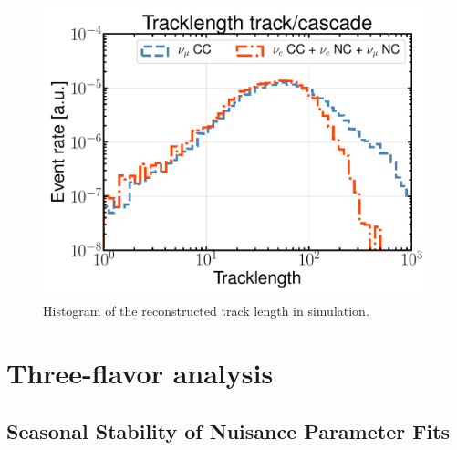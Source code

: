 \begin{figure}
    \centering
    \includegraphics[width=0.49\linewidth]{figures/icecube/classification/variables/tracklength.pdf}
    \caption{Histogram of the reconstructed track length in simulation.}
    \label{fig:apx-pidvars-length}
\end{figure}

\section{Three-flavor analysis}
\subsection{Seasonal Stability of Nuisance Parameter Fits}


